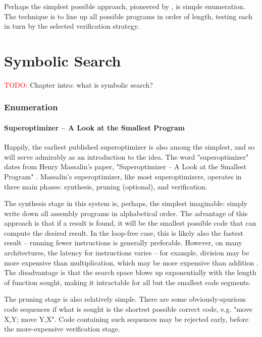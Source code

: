 \documentclass[12pt,twoside]{reedthesis}
\newcommand{\red}[1]{\textcolor{red}{#1}}
\begin{document}
    Perhaps the simplest possible approach, pioneered by \cite{massalin1987superoptimizer}, is simple enumeration. 
    The technique is to line up all possible programs in order of length, testing each in turn by the selected verification strategy. 

\chapter{Symbolic Search}
    \red{TODO:} Chapter intro: what is symbolic search?
    \subsection{Enumeration}
        \subsubsection{Superoptimizer -- A Look at the Smallest Program}
            Happily, the earliest published superoptimizer is also among the simplest, and so will serve admirably as an introduction to the idea.
            The word "superoptimizer" dates from Henry Massalin's paper, "Superoptimizer -- A Look at the Smallest Program" \cite{massalin1987superoptimizer}.
            Massalin's superoptimizer, like most superoptimizers, operates in three main phases: synthesis, pruning (optional), and verification.
                
            The synthesis stage in this system is, perhaps, the simplest imaginable: simply write down all assembly programs in alphabetical order.
            The advantage of this approach is that if a result is found, it will be the smallest possible code that can compute the desired result.
            In the loop-free case, this is likely also the fastest result -- running fewer instructions is generally preferable.
            However, on many architectures, the latency for instructions varies -- for example, division may be more expensive than multiplication, which may be more expensive than addition \cite{fog1996instructiontables}.
            The disadvantage is that the search space blows up exponentially with the length of function sought, making it intractable for all but the smallest code segments.
                
            The pruning stage is also relatively simple.
            There are some obviously-spurious code sequences if what is sought is the shortest possible correct code, e.g. "move X,Y; move Y,X".
            Code containing such sequences may be rejected early, before the more-expensive verification stage.
                
\end{document}
